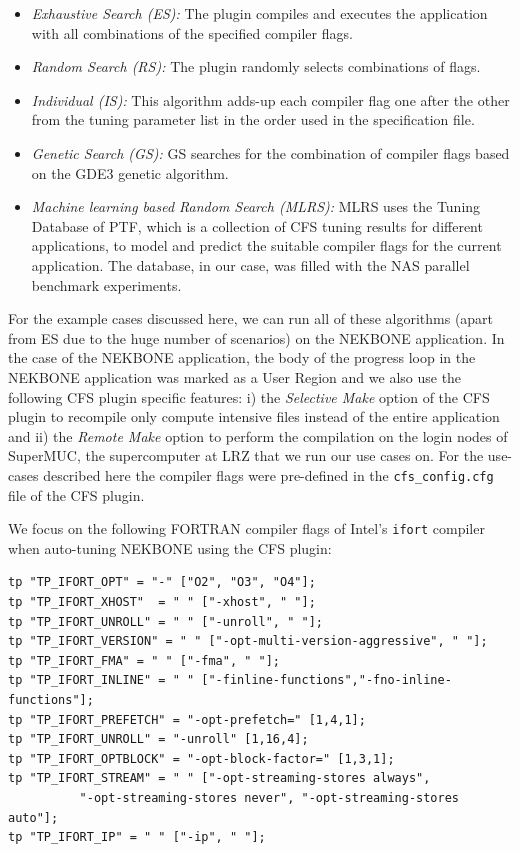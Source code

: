 \begin{itemize}
\item \textit{Exhaustive Search (ES):} The plugin compiles and executes the application with all combinations of the specified compiler flags.
\item \textit{Random Search (RS):} The plugin randomly selects combinations of flags.
\item \textit{Individual (IS):} This algorithm adds-up each compiler flag one after the other from the tuning parameter list in the order used  in the specification file.
\item \textit{Genetic Search (GS): } GS searches for the combination of compiler flags based on the GDE3 genetic algorithm.
\item \textit{Machine learning based Random Search (MLRS): } MLRS uses the Tuning Database of PTF, which is a collection of CFS tuning results for different applications, to model and predict the suitable compiler flags for the current application. The database, in our case, was filled with the NAS parallel benchmark experiments.
\end{itemize}

For the example cases discussed here, we can run all of these algorithms (apart from ES due to the huge number of scenarios) on the NEKBONE application. In the case of the NEKBONE application, the body of the progress loop in the NEKBONE application was marked as a User Region and we also use the following CFS plugin specific features: i) the \textit{Selective Make} option of the CFS plugin to recompile only compute intensive files instead of the entire application and ii) the \textit{Remote Make} option to perform the compilation on the login nodes of SuperMUC, the supercomputer at LRZ that we run our use cases on. For the use-cases described here the compiler flags were pre-defined in the {\tt cfs\_config.cfg} file of the CFS plugin.

We focus on the following FORTRAN compiler flags of Intel's {\tt ifort} compiler when auto-tuning NEKBONE using the CFS plugin:

\begin{verbatim}
tp "TP_IFORT_OPT" = "-" ["O2", "O3", "O4"];
tp "TP_IFORT_XHOST"  = " " ["-xhost", " "];
tp "TP_IFORT_UNROLL" = " " ["-unroll", " "];
tp "TP_IFORT_VERSION" = " " ["-opt-multi-version-aggressive", " "];
tp "TP_IFORT_FMA" = " " ["-fma", " "];
tp "TP_IFORT_INLINE" = " " ["-finline-functions","-fno-inline-functions"];
tp "TP_IFORT_PREFETCH" = "-opt-prefetch=" [1,4,1];
tp "TP_IFORT_UNROLL" = "-unroll" [1,16,4];
tp "TP_IFORT_OPTBLOCK" = "-opt-block-factor=" [1,3,1];
tp "TP_IFORT_STREAM" = " " ["-opt-streaming-stores always",
          "-opt-streaming-stores never", "-opt-streaming-stores auto"];
tp "TP_IFORT_IP" = " " ["-ip", " "];
\end{verbatim}


